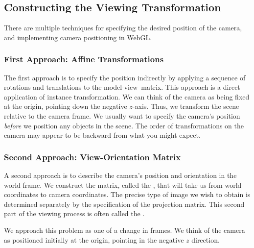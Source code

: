 \documentclass[../COS3712_Notes.tex]{subfiles}
\begin{document}
      \subsection{Constructing the Viewing Transformation}
        There are multiple techniques for specifying the desired position of the camera,
        and implementing camera positioning in WebGL.

        \subsubsection{First Approach: Affine Transformations}
          The first approach is to specify the position indirectly by applying a sequence
          of rotations and translations to the model-view~matrix.
          This approach is a direct application of instance transformation.
          We can think of the camera as being fixed at the origin,
          pointing down the negative $z$-axis.
          Thus, we transform the scene relative to the camera frame.
          We usually want to specify the camera's position \emph{before} we position any objects
          in the scene.
          The order of transformations on the camera may appear to be backward from what you might
          expect.

        \subsubsection{Second Approach: View-Orientation Matrix}
          A second approach is to describe the camera's position and orientation
          in the world frame.
          We construct the matrix, called the ,
          that will take us from world coordinates to camera coordinates.
          The precise type of image we wish to obtain is determined separately by the
          specification of the projection matrix.
          This second part of the viewing process is often called the
          .

          We approach this problem as one of a change in frames.
          We think of the camera as positioned initially at the origin, pointing in the
          negative $z$ direction.
\end{document}
